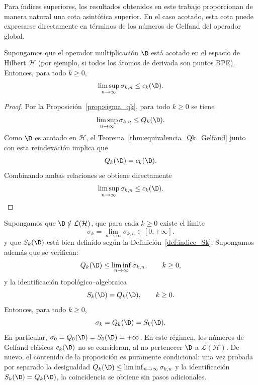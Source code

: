 Para índices superiores, los resultados obtenidos en este trabajo proporcionan de manera natural una cota asintótica superior. En el caso acotado, esta cota puede expresarse directamente en términos de los números de Gelfand del operador global.

\begin{cor}\label{cor:convergencia_qk_condicional}
	Supongamos que el operador multiplicación $\D$ está acotado en el espacio de Hilbert $\mathcal{H}$ (por ejemplo, si todos los átomos de derivada son puntos BPE). Entonces, para todo $k \ge 0$,
	\[
		\limsup_{n \to \infty} \sigma_{k,n} \le c_k(\D).
	\]
\end{cor}

\begin{proof}
	Por la Proposición~\ref{prop:sigma_qk}, para todo $k \ge 0$ se tiene
	\[
		\limsup_{n \to \infty} \sigma_{k,n} \le Q_k(\D).
	\]
	Como $\D$ es acotado en $\mathcal{H}$, el Teorema~\ref{thm:equivalencia_Qk_Gelfand} junto con esta reindexación implica que
	\[
		Q_k(\D) = c_k(\D).
	\]
	Combinando ambas relaciones se obtiene directamente
	\[
		\limsup_{n \to \infty} \sigma_{k,n} \le c_k(\D).
	\]
\end{proof}

\begin{prop}\label{prop:coincidencia_no_acotado}
	Supongamos que $\D\notin\mathcal{L}(\mathcal{H})$, que para cada $k\ge0$ existe el límite
	\[
		\sigma_k=\lim_{n\to\infty}\sigma_{k,n}\in[0,+\infty].
	\]
	y que $S_k(\D)$ está bien definido según la Definición~\ref{def:indice_Sk}. Supongamos además que se verifican:
	\[
		Q_k(\D)\le \liminf_{n\to\infty}\sigma_{k,n},
		\qquad k\ge0,
	\]
	y la identificación topológico--algebraica
	\[
		S_k(\D)=Q_k(\D),
		\qquad k\ge0.
	\]
	Entonces, para todo $k\ge0$,
	\[
		\sigma_{k}=Q_k(\D)=S_k(\D).
	\]
	En particular, $\sigma_0=Q_0(\D)=S_0(\D)=+\infty$. En este régimen, los números de Gelfand clásicos $c_k(\D)$ no se consideran, al no pertenecer $\D$ a $\mathcal{L}(\mathcal{H})$.
	De nuevo, el contenido de la proposición es puramente condicional: una vez probada por separado la desigualdad $Q_k(\D)\le \liminf_{n\to\infty}\sigma_{k,n}$ y la identificación $S_k(\D)=Q_k(\D)$, la coincidencia se obtiene sin pasos adicionales.
\end{prop}

